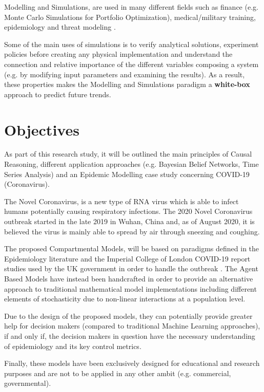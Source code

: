 Modelling and Simulations, are used in many different fields such as finance (e.g. Monte Carlo Simulations for Portfolio Optimization), medical/military training, epidemiology and threat modeling \cite{mod_2, mod_3}. 

Some of the main uses of simulations is to verify analytical solutions, experiment policies before creating any physical implementation and understand the connection and relative importance of the different variables composing a system (e.g. by modifying input parameters and examining the results). As a result, these properties makes the Modelling and Simulations paradigm a \textbf{white-box} approach to predict future trends.

\section{Objectives}
\vspace{-0.1cm}
As part of this research study, it will be outlined the main principles of Causal Reasoning, different application approaches (e.g. Bayesian Belief Networks, Time Series Analysis) and an Epidemic Modelling case study concerning COVID-19 (Coronavirus). 

The Novel Coronavirus, is a new type of RNA virus which is able to infect humans potentially causing respiratory infections. The 2020 Novel Coronavirus outbreak started in the late 2019 in Wuhan, China and, as of August 2020, it is believed the virus is mainly able to spread by air through sneezing and coughing. 

The proposed Compartmental Models, will be based on paradigms defined in the Epidemiology literature \cite{adam_k} and the Imperial College of London COVID-19 report studies used by the UK government in order to handle the outbreak \cite{mod_4}. The Agent Based Models have instead been handcrafted in order to provide an alternative approach to traditional mathematical model implementations including different elements of stochasticity due to non-linear interactions at a population level. 

Due to the design of the proposed models, they can potentially provide greater help for decision makers (compared to traditional Machine Learning approaches), if and only if, the decision makers in question have the necessary understanding of epidemiology and its key control metrics. 

Finally, these models have been exclusively designed for educational and research purposes and are not to be applied in any other ambit (e.g. commercial, governmental).

